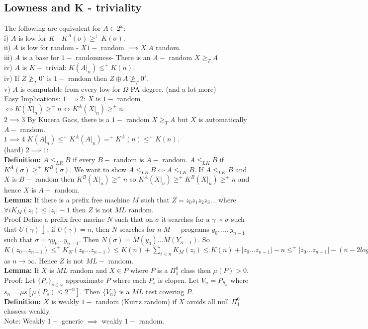 \documentclass{article}
\begin{document}
      \subsection{Lowness and K - triviality}
      The following are equivalent for $A \in 2^\omega$:\\
       i) $A$ is low for $K$ - $K^A(\sigma) \geq^+ K(\sigma)$.\\ ii) $A$ is low for random - $X 1- $ random $\implies X \; A$ random. \\
      iii) $A$ is a base for $1-$ randomness- There is an $A-$ random $X \geq_TA$ \\
      iv) $A$ is $K-$ trivial: $K(A|_n) \leq^+ K(n)$.\\
      iv) If $Z \not \geq_T0'$ is $1-$ random then $Z \oplus A \not \geq_T 0'$.\\
      v) $A$ is computable from every low for $\Omega$ PA degree. (and a lot more)\\
      Easy Implications: $1\implies 2$: $X$ is $1-$ random $\iff K(X|_n) \geq^+ n \iff K^A(X|_n) \geq^+ n$.\\
      $2\implies 3$ By Kucera Gacs, there is a $1-$ random $X \geq_TA$ but $X$ is automatically $A - $ random.\\
      $1\implies 4$ $K(A|_n) \leq^+ K^A(A|_n) =^+ K^A(n) \leq^+ K(n)$.\\
      (hard) $2 \implies 1$: \\
      \textbf{Definition:} $A\leq_{LR} B$ if every $B-$ random is $A-$ random. $A \leq_{LK} B$ if $K^A(\sigma) \geq^+ K^B(\sigma)$.
      We want to show $A \leq_{LR} B \iff A \leq_{LK} B$. If $A \leq_{LK} B$ and $X$ is $B-$ random then $K^B(X|_n) \geq^+ n$ so $K^A(X|_n) \geq^+ K^B(X|_n) \geq^+ n$ and hence $X$ is $A-$ random.
      \\ \textbf{Lemma:} If there is a prefix free machine $M$ such that $Z = z_0 z_1 z_2 z_3...$ where $\forall i  K_M(z_i) \leq |z_i| - 1$ then $Z$ is not $ML$ random.\\
      Proof Define a prefix free macine $N$ such that on $\sigma$ it searches for a $\gamma \prec \sigma$ such that $U(\gamma) \downarrow$, if $U(\gamma)  =n $, then $N$ searches for $n \; M-$ programs $y_0,...,y_{n-1}$ such that $\sigma = \gamma y_0 ... y_{n-1}$. Then $N(\sigma) = M(y_0)...M(Y_{n-1})$. So $K(z_0...z_{n-1}) \leq^+ K_N(z_0...z_{n-1}) \leq K(n) + \sum_{i < n} K_M(z_i) \leq K(n) + |z_0...z_{n-1}| - n\leq^+ |z_0...z_{n-1}| - (n-2log n) \to \infty$ as $n \to \infty$. Hence $Z$ is not $ML-$ random.\\
      \textbf{Lemma:} If $X$ is $ML$ random and $X \in P$ where $P$ is a $\Pi^0_1$ class then $\mu(P) > 0$.
      Proof: Let $\{P_s\}_{s \in \omega}$ approximate $P$ where each $P_s$ is clopen. Let $V_n = P_{S_n} $ where $s_n = \mu s [\mu(P_s) \leq 2^{-n}]$. Then $\{V_n\}$ is a $ML$ test covering $P$.\\
      \textbf{Definition:} $X$ is weakly $1-$ random (Kurtz random) if $X$ avoids all null $\Pi^0_1$ classess weakly.\\
      Note: Weakly $1-$ generic $\implies $ weakly $1-$ random.\newpage
\end{document}
